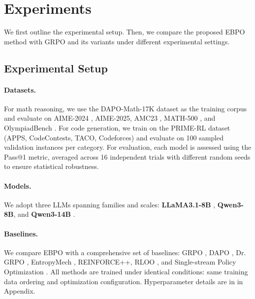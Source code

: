 \documentclass{article}
\theoremstyle{plain}
\theoremstyle{definition}
\theoremstyle{remark}
\newcommand{\ours}{\textsc{EBPO}\xspace}
\begin{document}
\section{Experiments}
\label{sec:experiments}

We first outline the experimental setup. Then, we compare the proposed \ours method with GRPO and its variants under different experimental settings.

\subsection{Experimental Setup}
\label{sec:setup}

\paragraph{Datasets.}
For math reasoning, we use the DAPO-Math-17K dataset \citep{yu2025dapo} as the training corpus and evaluate on AIME-2024 \citep{li2024numinamath}, AIME-2025, AMC23 \citep{li2024numinamath}, MATH-500 \citep{hendrycks2021measuring}, and OlympiadBench \citep{he2024olympiadbench}. For code generation, we train on the PRIME-RL \citep{cui2025process} dataset (APPS, CodeContests, TACO, Codeforces) and evaluate on 100 sampled validation instances per category. For evaluation, each model is assessed using the Pass@1 metric, averaged across 16 independent trials with different random seeds to ensure statistical robustness.

\paragraph{Models.}
We adopt three LLMs spanning families and scales: \textbf{LLaMA3.1-8B} \citep{dubey2024llama}, \textbf{Qwen3-8B}, and \textbf{Qwen3-14B} \citep{yang2025qwen3}.

\paragraph{Baselines.}
We compare EBPO with a comprehensive set of baselines: GRPO \citep{shao2024deepseekmath}, DAPO \citep{yu2025dapo}, Dr.\,GRPO \citep{liu2025understanding}, EntropyMech \citep{cui2025entropy}, REINFORCE++, RLOO \citep{hu2025reinforce++}, and Single-stream Policy Optimization \citep{xu2025single}. All methods are trained under identical conditions: same training data ordering and optimization configuration. Hyperparameter details are in  in Appendix.
\end{document}

